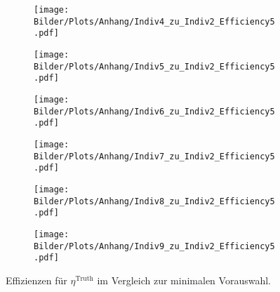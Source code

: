 \begin{figure}
  \begin{subfigure}[t]{0.5\textwidth}
  \texttt{[image: Bilder/Plots/Anhang/Indiv4\_zu\_Indiv2\_Efficiency5.pdf]}
  \end{subfigure}
\begin{subfigure}[t]{0.5\textwidth}
 \texttt{[image: Bilder/Plots/Anhang/Indiv5\_zu\_Indiv2\_Efficiency5.pdf]}
\end{subfigure}
\begin{subfigure}[t]{0.5\textwidth}
  \texttt{[image: Bilder/Plots/Anhang/Indiv6\_zu\_Indiv2\_Efficiency5.pdf]}
\end{subfigure}
\begin{subfigure}[t]{0.5\textwidth}
  \texttt{[image: Bilder/Plots/Anhang/Indiv7\_zu\_Indiv2\_Efficiency5.pdf]}
\end{subfigure}
\begin{subfigure}[t]{0.5\textwidth}
  \texttt{[image: Bilder/Plots/Anhang/Indiv8\_zu\_Indiv2\_Efficiency5.pdf]}
\end{subfigure}
\begin{subfigure}[t]{0.5\textwidth}
  \texttt{[image: Bilder/Plots/Anhang/Indiv9\_zu\_Indiv2\_Efficiency5.pdf]}
\end{subfigure}
\caption{Effizienzen für $\eta^{\text{Truth}}$ im Vergleich zur minimalen Vorauswahl.}
\end{figure}
